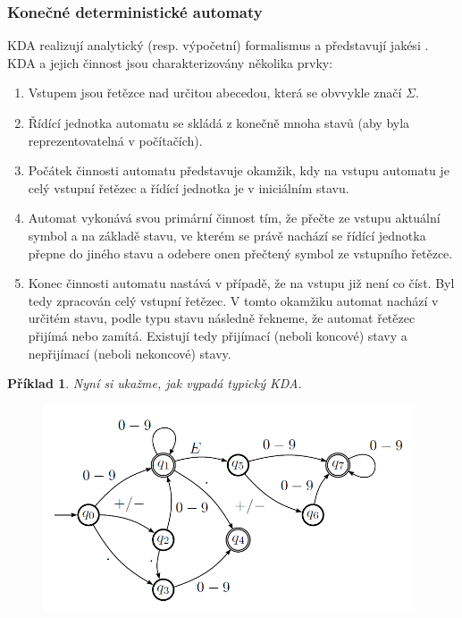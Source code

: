 \documentclass[10pt,a4paper]{article}
\theoremstyle{note}
\newtheorem{priklad}{Příklad}
\begin{document}
\subsubsection{Konečné deterministické automaty}

 KDA realizují analytický (resp. výpočetní) formalismus a představují jakési .
KDA a jejich činnost jsou charakterizovány několika prvky:
\begin{enumerate}
\item
Vstupem jsou řetězce nad určitou abecedou, která se obvvykle značí $\Sigma$.

\item
Řídící jednotka automatu se skládá z konečně mnoha stavů (aby byla reprezentovatelná v počítačích).

\item
Počátek činnosti automatu představuje okamžik, kdy na vstupu automatu je celý vstupní řetězec a
řídící jednotka je v iniciálním stavu.

\item
Automat vykonává svou primární činnost tím, že přečte ze vstupu aktuální symbol a na základě stavu, ve kterém se právě
nachází se řídící jednotka přepne do jiného stavu a odebere onen přečtený symbol ze vstupního řetězce.

\item
Konec činnosti automatu nastává v případě, že na vstupu již není co číst. Byl tedy zpracován celý
vstupní řetězec. V tomto okamžiku automat nachází v určitém stavu, podle typu stavu následně řekneme, že
automat řetězec přijímá nebo zamítá. Existují tedy přijímací (neboli koncové) stavy a nepřijímací (neboli nekoncové) stavy.
\end{enumerate}

\begin{priklad}
Nyní si ukažme, jak vypadá typický KDA.

\begin{figure}[H]
\begin{center}
\includegraphics[width=11cm]{img/KDA-priklad.png}
\end{center}
\end{figure}
\end{priklad}
\end{document}
